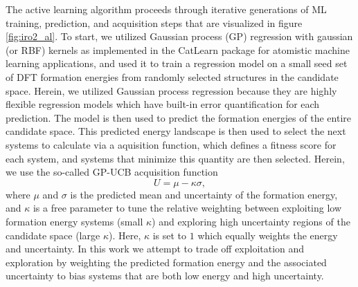 %
%
The active learning algorithm proceeds through iterative generations of ML training, prediction, and acquisition steps that are visualized in figure \ref{fig:iro2_al}.
%
To start, we utilized Gaussian process (GP) regression with gaussian (or RBF) kernels as implemented in the CatLearn\cite{hansen2019atomistic,CatLearn_Repo} package for atomistic machine learning applications, and used it to train a regression model on a small seed set of DFT formation energies from randomly selected structures in the candidate space.
%
Herein, we utilized Gaussian process regression because they are highly flexible regression models which have built-in error quantification for each prediction.
%
The model is then used to predict the formation energies of the entire candidate space.
%
This predicted energy landscape is then used to select the next systems to calculate via a aquisition function, which defines a fitness score for each system, and systems that minimize this quantity are then selected.
%
Herein, we use the so-called GP-UCB acquisition function
%
\begin{equation}
    U = \mu - \kappa \sigma,
\end{equation}
%
where $\mu$ and $\sigma$ is the predicted mean and uncertainty of the formation energy,
and $\kappa$ is a free parameter to tune the relative weighting between exploiting low formation energy systems (small $\kappa$) and exploring high uncertainty regions of the candidate space (large $\kappa$).
%
Here, $\kappa$ is set to $1$ which equally weights the energy and uncertainty.
%
In this work we attempt to trade off exploitation and exploration by weighting the predicted formation energy and the associated uncertainty to bias systems that are both low energy and high uncertainty.
%
